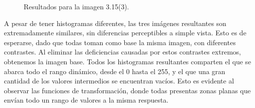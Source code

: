 \documentclass[12pt]{article}
\begin{document}
\begin{figure}[htbp]
	\centering
	\quad
	\quad
	\caption{Resultados para la imagen 3.15(3).}
	\label{img:resultados 3}
\end{figure}

A pesar de tener histogramas diferentes, las tres imágenes resultantes son extremadamente similares, sin diferencias perceptibles a simple vista. Esto es de esperarse, dado que todas toman como base la misma imagen, con diferentes contrastes. Al eliminar las deficiencias causadas por estos contrastes extremos, obtenemos la imagen base. Todos los histogramas resultantes comparten el que se abarca todo el rango dinámico, desde el 0 hasta el 255, y el que una gran cantidad de los valores intermedios se encuentran vacíos. Esto es evidente al observar las funciones de transformación, donde todas presentas zonas planas que envían todo un rango de valores a la misma respuesta. 
\end{document}
